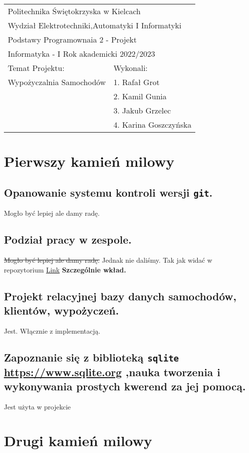 \documentclass[11pt]{article}
\author{placeholder}
\date{\today}
\title{}
\begin{document}
\begin{center}
\begin{tabular}{|l|l|}
\hline
\multicolumn{2}{|l|}{Politechnika Świętokrzyska w Kielcach} \\
\multicolumn{2}{|l|}{Wydział Elektrotechniki,Automatyki I Informatyki} \\
\hline
\multicolumn{2}{|l|}{Podstawy Programownaia 2 - Projekt} \\
\multicolumn{2}{|l|}{Informatyka - I Rok akademicki 2022/2023} \\
\hline
Temat Projektu: & Wykonali: \\
Wypożyczalnia Samochodów & 1. Rafał Grot \\
 & 2. Kamil Gunia \\
 & 3. Jakub Grzelec \\
 & 4. Karina Goszczyńska \\
\hline
\end{tabular}
\end{center}
\section{Pierwszy kamień milowy}
\label{sec:org56d3d1a}
\subsection{Opanowanie systemu kontroli wersji \texttt{git}.}
\label{sec:org5a91803}
Mogło być lepiej ale damy radę.
\subsection{Podział pracy w zespole.}
\label{sec:orgbe6bf3f}
\sout{Mogło być lepiej ale damy radę.} Jednak nie daliśmy. Tak jak widać w repozytorium
\href{https://github.com/rafal11ck/PSK-INF-PROJ-podstway-programowania-2/}{Link}
\textbf{Szczególnie wkład.}
\subsection{Projekt relacyjnej bazy danych samochodów, klientów, wypożyczeń.}
\label{sec:orgb029f04}
Jest. Włącznie z implementacją.
\subsection{Zapoznanie się z biblioteką \texttt{sqlite} \url{https://www.sqlite.org} ,nauka tworzenia i wykonywania prostych kwerend za jej pomocą.}
\label{sec:org0acbd11}
Jest użyta w projekcie
\section{Drugi kamień milowy}
\label{sec:org1734700}
\end{document}

